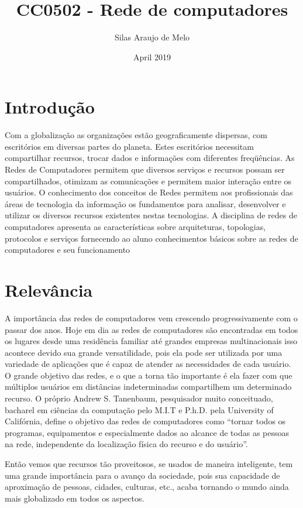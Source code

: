 \documentclass[10pt]{article}
\title{CC0502 - Rede de computadores}
\author{Silas Araujo de Melo}
\date{April 2019}
\begin{document}
\maketitle

\section{Introdução}
Com a globalização as organizações estão geograficamente dispersas, com
escritórios em diversas partes do planeta. Estes escritórios necessitam
compartilhar recursos, trocar dados e informações com diferentes freqüências.
As Redes de Computadores permitem que diversos serviços e recursos possam
ser compartilhados, otimizam as comunicações e permitem maior interação
entre os usuários. O conhecimento dos conceitos de Redes permitem aos
profissionais das áreas de tecnologia da informação os fundamentos para
analisar, desenvolver e utilizar os diversos recursos existentes nestas
tecnologias.
A disciplina de redes de computadores apresenta as características sobre
arquiteturas, topologias, protocolos e serviços fornecendo ao aluno
conhecimentos básicos sobre as redes de computadores e seu funcionamento 
\begin{figure}[!htb] 
\end{figure}
\section{Relevância}
A importância das redes de computadores vem crescendo progressivamente com o passar dos anos. Hoje em dia as redes de computadores são encontradas em todos os lugares desde uma residência familiar até grandes empresas multinacionais isso acontece devido sua grande versatilidade, pois ela pode ser utilizada por uma variedade de aplicações que é capaz de atender as necessidades de cada usuário. O grande objetivo das redes, e o que a torna tão importante é ela fazer com que múltiplos usuários em distâncias indeterminadas compartilhem um determinado recurso. O próprio Andrew S. Tanenbaum, pesquisador muito conceituado, bacharel em ciências da computação pelo M.I.T e P.h.D. pela University of Califórnia, define o objetivo das redes de computadores como “tornar todos os programas, equipamentos e especialmente dados ao alcance de todas as pessoas na rede, independente da localização física do recurso e do usuário”.

Então vemos que recursos tão proveitosos, se usados de maneira inteligente, tem uma grande importância para o avanço da sociedade, pois sua capacidade de aproximação de pessoas, cidades, culturas, etc., acaba tornando o mundo ainda mais globalizado em todos os aspectos.
\end{document}
